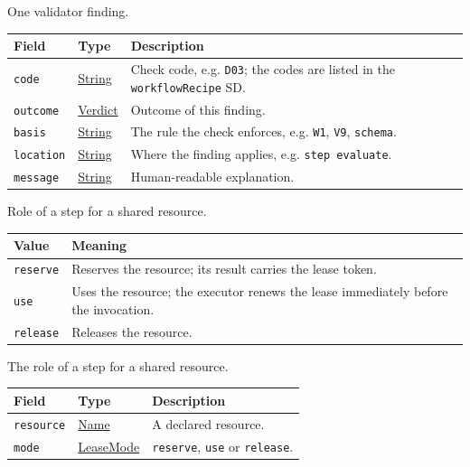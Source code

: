 \documentclass[a4paper]{arrowhead}
\newcommand{\mref}[1]{{\textcolor{ArrowheadPurple}{\hyperref[sec:model:#1]{#1}}}}
\newcommand{\pref}[1]{{\textcolor{ArrowheadGrey}{\hyperref[sec:model:primitives:#1]{#1}}}}
\begin{document}
One validator finding.

{\small
\begin{longtable}{|p{3.9cm}|p{4.4cm}|p{7.5cm}|}

\hline
\rowcolor{gray!33} Field & Type & Description \\ \hline
\endhead
\texttt{code} & \pref{String} & Check code, e.g. \texttt{D03}; the codes are listed in the \texttt{workflowRecipe} SD. \\ \hline
\texttt{outcome} & \mref{Verdict} & Outcome of this finding. \\ \hline
\texttt{basis} & \pref{String} & The rule the check enforces, e.g. \texttt{W1}, \texttt{V9}, \texttt{schema}. \\ \hline
\texttt{location} & \pref{String} & Where the finding applies, e.g. \texttt{step evaluate}. \\ \hline
\texttt{message} & \pref{String} & Human-readable explanation. \\ \hline
\end{longtable}
}

Role of a step for a shared resource.

{\small
\begin{longtable}{|p{3.9cm}|p{11.9cm}|}

\hline
\rowcolor{gray!33} Value & Meaning \\ \hline
\endhead
\texttt{reserve} & Reserves the resource; its result carries the lease token. \\ \hline
\texttt{use} & Uses the resource; the executor renews the lease immediately before the invocation. \\ \hline
\texttt{release} & Releases the resource. \\ \hline
\end{longtable}
}

The role of a step for a shared resource.

{\small
\begin{longtable}{|p{3.9cm}|p{4.4cm}|p{7.5cm}|}

\hline
\rowcolor{gray!33} Field & Type & Description \\ \hline
\endhead
\texttt{resource} & \pref{Name} & A declared resource. \\ \hline
\texttt{mode} & \mref{LeaseMode} & \texttt{reserve}, \texttt{use} or \texttt{release}. \\ \hline
\end{longtable}
}
\end{document}
